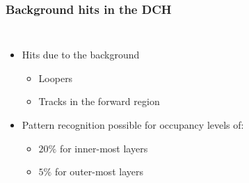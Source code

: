 \documentclass[aspectratio=169, hyperref={colorlinks=true,pdfpagelabels=false,linkcolor=black}, xcolor=dvipsnames,10pt]{beamer}
\begin{document}
\begin{frame}
	\frametitle{Background hits in the DCH}

	\begin{columns}
	\centering
       \begin{itemize}
         \item Hits due to the background  \vspace{0.2cm}
          \begin{itemize}
          \item Loopers
          \item Tracks in the forward region \vspace{1cm}
		\end{itemize}       
       
        \item Pattern recognition possible for occupancy levels of: \vspace{0.2cm}
          \begin{itemize}
          \item $20\%$ for inner-most layers
          \item $5\%$ for outer-most layers \vspace{0.2cm}
          \end{itemize}

        \end{itemize}


	\centering
\end{columns}
\end{frame}
\end{document}
